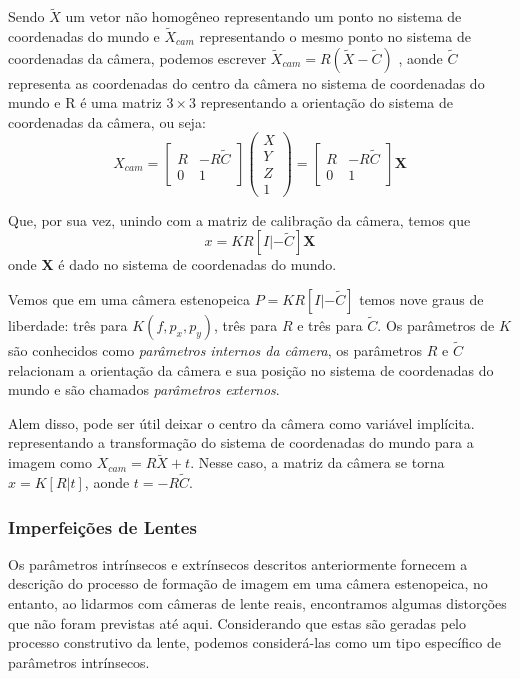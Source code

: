 \documentclass[ecp,tc]{iiufrgs}
\begin{document}
Sendo $ \widetilde{X} $ um vetor não homogêneo representando um ponto no sistema de coordenadas do mundo e $ \widetilde{X}_{cam} $ representando o mesmo ponto no sistema de coordenadas da câmera, podemos escrever $ \widetilde{X}_{cam} = R(\widetilde{X} - \widetilde{C}) $ , aonde $ \widetilde{C} $ representa as coordenadas do centro da câmera no sistema de coordenadas do mundo e R é uma matriz $ 3 \times 3 $ representando a orientação do sistema de coordenadas da câmera, ou seja:
\[ X_{cam} =
\begin{bmatrix} R & -R\widetilde{C} \\ 
0 & 1 \end{bmatrix}
\begin{pmatrix} X \\ Y \\ Z \\ 1 \end{pmatrix} =
\begin{bmatrix} R & -R\widetilde{C} \\ 
0 & 1 \end{bmatrix}
\textbf{X}  \]

Que, por sua vez, unindo com a matriz de calibração da câmera, temos que \[x = KR[I|-\widetilde{C}]\textbf{X} \] onde \textbf{X} é dado no sistema de coordenadas do mundo.

Vemos que em uma câmera estenopeica $ P = KR[I|-\widetilde{C}] $ temos nove graus de liberdade: três para $ K(f, p_x, p_y) $, três para $ R $ e três para $ \widetilde{C} $. Os parâmetros de $K$ são conhecidos como \textit{parâmetros internos da câmera}, os
parâmetros $R$ e $\widetilde{C}$ relacionam a orientação da câmera e sua posição no sistema de coordenadas do mundo e são chamados \textit{parâmetros externos}.

Alem disso, pode ser útil deixar o centro da câmera como variável implícita. representando a transformação do sistema de coordenadas do mundo para a imagem como $ X_{cam} = R\widetilde{X} + t $. Nesse caso, a matriz da câmera se torna $ x = K[R|t] $, aonde $ t = -R\widetilde{C} $.

\subsubsection{Imperfeições de Lentes}

Os parâmetros intrínsecos e extrínsecos descritos anteriormente fornecem a descrição do processo de formação de imagem em uma câmera estenopeica, no entanto, ao lidarmos com câmeras de lente reais, encontramos algumas distorções que não foram previstas
até aqui. Considerando que estas são geradas pelo processo construtivo da lente, podemos considerá-las como um tipo específico de parâmetros intrínsecos.
\end{document}
